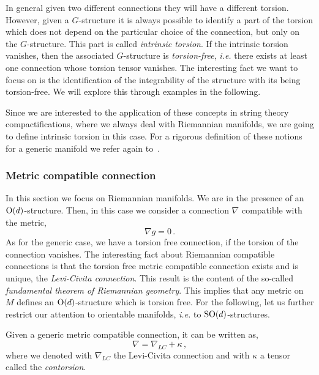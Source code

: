 \documentclass[debug]{phd}
\begin{document}
					In general given two different connections they will have a different torsion. 
					However, given a $G$-structure it is always possible to identify a part of the torsion which does not depend on the particular choice of the connection, but only on the $G$-structure.
					This part is called \emph{intrinsic torsion}.
					If the intrinsic torsion vanishes, then the associated $G$-structure is \emph{torsion-free}, \emph{i.e.} there exists at least one connection whose torsion tensor vanishes.
					The interesting fact we want to focus on is the identification of the integrability of the structure with its being torsion-free.
					We will explore this through examples in the following.
					
					Since we are interested to the application of these concepts in string theory compactifications, where we always deal with Riemannian manifolds, we are going to define intrinsic torsion in this case.
					For a rigorous definition of these notions for a generic manifold we refer again to~\cite{joyce}.
				\subsubsection{Metric compatible connection}
						In this section we focus on Riemannian manifolds.
						We are in the presence of an $\mathrm{O}(d)$-structure.
						Then, in this case we consider a connection $\nabla$ compatible with the metric, 
								\begin{equation}
									\nabla g = 0 \, .
								\end{equation}
						As for the generic case, we have a torsion free connection, if the torsion of the connection vanishes.
						The interesting fact about Riemannian compatible connections is that the torsion free metric compatible connection exists and is unique, the \emph{Levi-Civita connection}.
						This result is the content of the so-called \emph{fundamental theorem of Riemannian geometry}.
						This implies that any metric on $M$ defines an $\mathrm{O}(d)$-structure which is torsion free.
						For the following, let us further restrict our attention to orientable manifolds, \emph{i.e.} to $\mathrm{SO}(d)$-structures.
						
						Given a generic metric compatible connection, it can be written as,
								\begin{equation}\label{contrs}
									\nabla = \nabla_{LC} + \kappa\, ,
								\end{equation}
						where we denoted with $\nabla_{LC}$ the Levi-Civita connection and with $\kappa$ a tensor called the \emph{contorsion}.
						
\end{document}
